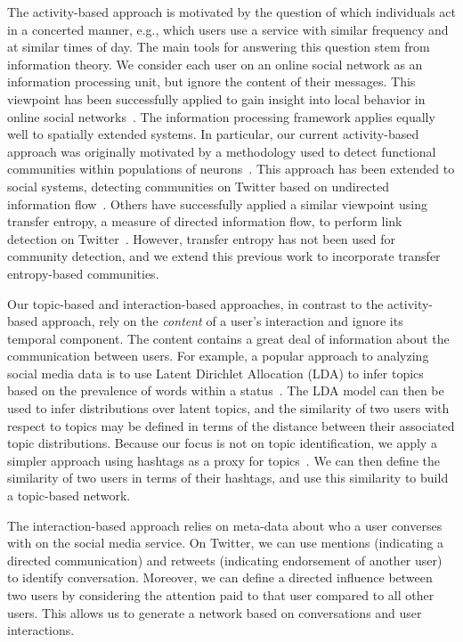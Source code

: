 The activity-based approach is motivated by the question of which individuals act in a concerted manner, e.g., which users use a service with similar frequency and at similar times of day. The main tools for answering this question stem from information theory. We consider each user on an online social network as an information processing unit, but ignore the content of their messages. This viewpoint has been successfully applied to gain insight into local behavior in online social networks~\cite{darmon2013understanding}. The information processing framework applies equally well to spatially extended systems. In particular, our current activity-based approach was originally motivated by a methodology used to detect functional communities within populations of neurons~\cite{shalizi2007discovering}. This approach has been extended to social systems, detecting communities on Twitter based on undirected information flow~\cite{darmon2013detecting}. Others have successfully applied a similar viewpoint using transfer entropy, a measure of directed information flow, to perform link detection on Twitter~\cite{ver2012information}. However, transfer entropy has not been used for community detection, and we extend this previous work to incorporate transfer entropy-based communities.

Our topic-based and interaction-based approaches, in contrast to the activity-based approach, rely on the \emph{content} of a user's interaction and ignore its temporal component. The content contains a great deal of information about the communication between users. For example, a popular approach to analyzing social media data is to use Latent Dirichlet Allocation (LDA) to infer topics based on the prevalence of words within a status~\cite{zhao2011comparing,michelson2010discovering}. The LDA model can then be used to infer distributions over latent topics, and the similarity of two users with respect to topics may be defined in terms of the distance between their associated topic distributions. Because our focus is not on topic identification, we apply a simpler approach using hashtags as a proxy for topics~\cite{becker2011beyond,tsur2012s}. We can then define the similarity of two users in terms of their hashtags, and use this similarity to build a topic-based network.

The interaction-based approach relies on meta-data about who a user converses with on the social media service. On Twitter, we can use mentions (indicating a directed communication) and retweets (indicating endorsement of another user) to identify conversation. Moreover, we can define a directed influence between two users by considering the attention paid to that user compared to all other users. This allows us to generate a network based on conversations and user interactions.

